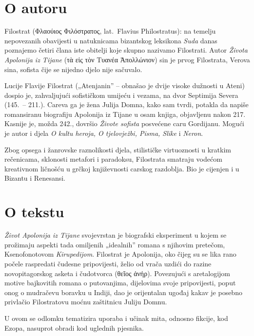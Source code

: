 \section*{O autoru}

Filostrat \textgreek[variant=ancient]{(Φλαούιος Φιλόστρατος,} lat.\ Flavius Philostratus): na temelju nepovezanih obavijesti u natuknicama bizantskog leksikona \textit{Suda} danas poznajemo četiri člana iste obitelji koje skupno nazivamo Filostrati. Autor \textit{Života Apolonija iz Tijane} \textgreek[variant=ancient]{(τὰ εἰς τὸν Τυανέα Ἀπολλώνιον)} sin je prvog Filostrata, Verova sina, sofista čije se nijedno djelo nije sačuvalo. 

Lucije Flavije Filostrat („Atenjanin'' – obnašao je dvije visoke dužnosti u Ateni) dospio je, zahvaljujući sofističkom umijeću i vezama, na dvor Septimija Severa (145.\ – 211.). Careva ga je žena Julija Domna, kako sam tvrdi, potakla da napiše romansiranu biografiju Apolonija iz Tijane u osam knjiga, objavljenu nakon 217. Kasnije je, možda 242., dovršio \textit{Živote sofista} posvećene caru Gordijanu. Mogući je autor i djela \textit{O kultu heroja, O tjelovježbi, Pisma, Slike} i \textit{Neron}. 

Zbog opsega i žanrovske raznolikosti djela, stilističke virtuoznosti u kratkim rečenicama, sklonosti metafori i paradoksu, Filostrata smatraju vodećom kreativnom ličnošću u grčkoj književnosti carskog razdoblja. Bio je cijenjen i u Bizantu i Renesansi.

\section*{O tekstu}

\textit{Život Apolonija iz Tijane} svojevrstan je biografski eksperiment u kojem se prožimaju aspekti tada omiljenih „idealnih'' romana s njihovim pretečom, Ksenofonotovom \textit{Kirupedijom}. Filostrat je Apolonija, oko čijeg su se lika rano počele raspredati čudesne pripovijesti, želio od vrača uzdići do razine novopitagorskog asketa i čudotvorca \textgreek[variant=ancient]{(θεῖος ἀνήρ).} Povezujući s aretalogijom motive bajkovitih romana o putovanjima, dijelovima svoje pripovijesti, poput onog o mudračevu boravku u Indiji, dao je orijentalan ugođaj kakav je posebno privlačio Filostratovu moćnu zaštitnicu Juliju Domnu. 

U ovom se odlomku tematizira uporaba i učinak mita, odnosno fikcije, kod Ezopa, nasuprot obradi kod uglednih pjesnika.

